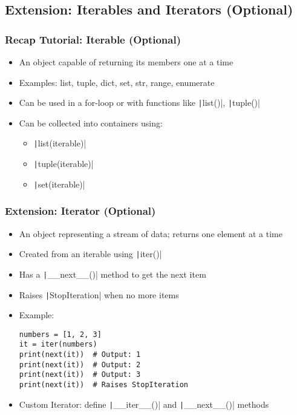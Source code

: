 \documentclass{beamer}
\begin{document}
\subsection{Extension: Iterables and Iterators (Optional)}
\begin{frame}
    \frametitle{Recap Tutorial: Iterable (Optional)}
    \begin{itemize}
        \item An object capable of returning its members one at a time
        \item Examples: list, tuple, dict, set, str, range, enumerate
        \item Can be used in a for-loop or with functions like \texttt|list()|, \texttt|tuple()|
        \item Can be collected into containers using:
              \begin{itemize}
                  \item \texttt|list(iterable)|
                  \item \texttt|tuple(iterable)|
                  \item \texttt|set(iterable)|
              \end{itemize}
    \end{itemize}
\end{frame}

\begin{frame}[fragile]
    \frametitle{Extension: Iterator (Optional)}
    \begin{itemize}
        \item An object representing a stream of data; returns one element at a time
        \item Created from an iterable using \texttt|iter()|
        \item Has a \texttt|__next__()| method to get the next item
        \item Raises \texttt|StopIteration| when no more items
        \item Example:
              \begin{verbatim}
numbers = [1, 2, 3]
it = iter(numbers)
print(next(it))  # Output: 1
print(next(it))  # Output: 2
print(next(it))  # Output: 3
print(next(it))  # Raises StopIteration
              \end{verbatim}
        \item Custom Iterator: define \texttt|__iter__()| and \texttt|__next__()| methods
    \end{itemize}
\end{frame}
\end{document}
